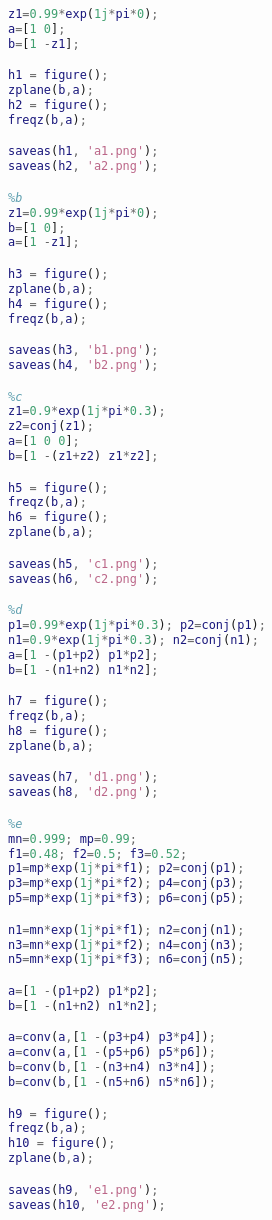 \documentclass[11pt, a4paper]{article}
\begin{document}
\begin{lstlisting}[language=matlab, frame=single]    
%a
z1=0.99*exp(1j*pi*0);
a=[1 0];
b=[1 -z1];

h1 = figure();
zplane(b,a);
h2 = figure();
freqz(b,a);

saveas(h1, 'a1.png');
saveas(h2, 'a2.png');

%b
z1=0.99*exp(1j*pi*0);
b=[1 0];
a=[1 -z1];

h3 = figure();
zplane(b,a);
h4 = figure();
freqz(b,a);

saveas(h3, 'b1.png');
saveas(h4, 'b2.png');

%c
z1=0.9*exp(1j*pi*0.3);
z2=conj(z1);
a=[1 0 0];
b=[1 -(z1+z2) z1*z2];

h5 = figure();
freqz(b,a);
h6 = figure();
zplane(b,a);

saveas(h5, 'c1.png');
saveas(h6, 'c2.png');

%d
p1=0.99*exp(1j*pi*0.3); p2=conj(p1);
n1=0.9*exp(1j*pi*0.3); n2=conj(n1);
a=[1 -(p1+p2) p1*p2];
b=[1 -(n1+n2) n1*n2];

h7 = figure();
freqz(b,a);
h8 = figure();
zplane(b,a);

saveas(h7, 'd1.png');
saveas(h8, 'd2.png');

%e
mn=0.999; mp=0.99;
f1=0.48; f2=0.5; f3=0.52;
p1=mp*exp(1j*pi*f1); p2=conj(p1);
p3=mp*exp(1j*pi*f2); p4=conj(p3);
p5=mp*exp(1j*pi*f3); p6=conj(p5);

n1=mn*exp(1j*pi*f1); n2=conj(n1);
n3=mn*exp(1j*pi*f2); n4=conj(n3);
n5=mn*exp(1j*pi*f3); n6=conj(n5);

a=[1 -(p1+p2) p1*p2];
b=[1 -(n1+n2) n1*n2];

a=conv(a,[1 -(p3+p4) p3*p4]);
a=conv(a,[1 -(p5+p6) p5*p6]);
b=conv(b,[1 -(n3+n4) n3*n4]);
b=conv(b,[1 -(n5+n6) n5*n6]);

h9 = figure();
freqz(b,a);
h10 = figure();
zplane(b,a);

saveas(h9, 'e1.png');
saveas(h10, 'e2.png');
\end{lstlisting}
\end{document}
